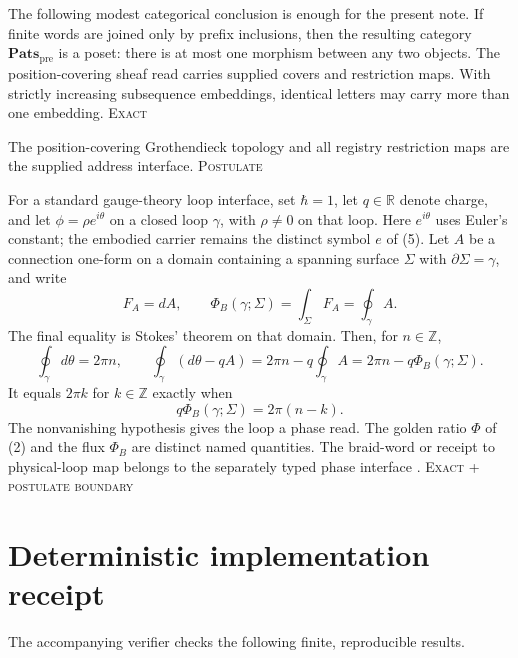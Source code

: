 \documentclass[10pt]{article}
\theoremstyle{remark}
\newcommand{\Pats}{\mathbf{Pats}}
\newcommand{\Z}{\mathbb Z}
\newcommand{\R}{\mathbb R}
\newcommand{\cstatus}[1]{\hfill\textsc{#1}}
\newcommand{\exact}{\textsc{Exact}}
\newcommand{\postulate}{\textsc{Postulate}}
\begin{document}
The following modest categorical conclusion is enough for the present note.
If finite words are joined only by prefix inclusions, then the resulting
category $\Pats_{\mathrm{pre}}$ is a poset: there is at most one morphism
between any two objects.  The position-covering sheaf read carries supplied
covers and restriction maps.  With strictly increasing subsequence embeddings,
identical letters may carry more than one embedding.
\cstatus{\exact}

The position-covering Grothendieck topology and all registry restriction maps
are the supplied address interface. \cstatus{\postulate}

For a standard gauge-theory loop interface, set $\hbar=1$, let
$q\in\R$ denote charge, and let $\phi=\rho e^{i\theta}$ on a closed loop
$\gamma$, with $\rho\ne0$ on that loop.  Here $e^{i\theta}$ uses Euler's
constant; the embodied carrier remains the distinct symbol $e$ of (5).
Let $A$ be a connection one-form on a domain containing a spanning surface
$\Sigma$ with $\partial\Sigma=\gamma$, and write
\[
 F_A=dA,\qquad \Phi_B(\gamma;\Sigma)=\int_\Sigma F_A=\oint_\gamma A.
\]
The final equality is Stokes' theorem on that domain.  Then, for
$n\in\Z$,
\[
 \oint_\gamma d\theta=2\pi n,\qquad
 \oint_\gamma(d\theta-qA)=2\pi n-q\oint_\gamma A
 =2\pi n-q\Phi_B(\gamma;\Sigma).
\tag{27}
\]
It equals $2\pi k$ for $k\in\Z$ exactly when
\[
 q\Phi_B(\gamma;\Sigma)=2\pi(n-k).
\tag{28}
\]
The nonvanishing hypothesis gives the loop a phase read.  The golden ratio
$\Phi$ of (2) and the flux $\Phi_B$ are distinct named quantities.  The
braid-word or receipt to physical-loop map belongs to the separately typed
phase interface \cite{weyl1929,aharonovbohm1959}.
\cstatus{Exact + postulate boundary}

\section{Deterministic implementation receipt}

The accompanying verifier checks the following finite, reproducible results.
\end{document}
